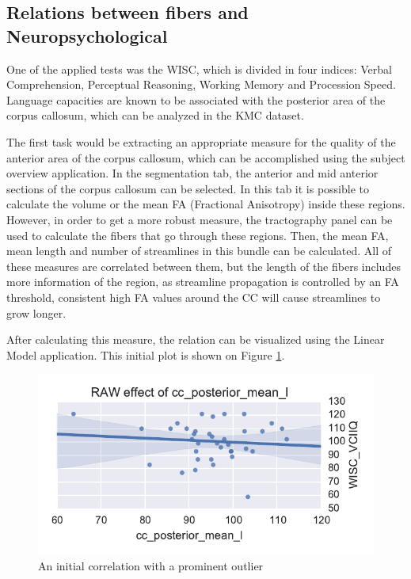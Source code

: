 \documentclass[twocolumn]{svjour3}
\begin{document}
\subsection{Relations between fibers and Neuropsychological}

One of the applied tests was the WISC, which is divided in four indices: Verbal Comprehension, Perceptual Reasoning, Working Memory and Procession Speed. 	Language capacities are known to be associated with the posterior area of the corpus callosum, which can be analyzed in the KMC dataset. 

The first task would be extracting an appropriate measure for the quality of the anterior area of the corpus callosum, which can be accomplished using the subject overview application. In the segmentation tab, the anterior and mid anterior sections of the corpus callosum can be selected. In this tab it is possible to calculate the volume or the mean FA (Fractional Anisotropy) inside these regions. However, in order to get a more robust measure, the tractography panel can be used to calculate the fibers that go through these regions. Then, the mean FA, mean length and number of streamlines in this bundle can be calculated. All of these measures are correlated between them, but the length of the fibers includes more information of the region, as streamline propagation is controlled by an FA threshold, consistent high FA values around the CC will cause streamlines to grow longer.

After calculating this measure, the relation can be visualized using the Linear Model application. This initial plot is shown on Figure \ref{fig_lm}.

\begin{figure}
\begin{center}
\includegraphics[width=\linewidth]{figures/cases/initial_corr}
\end{center}
 \caption{\label{fig_lm}An initial correlation with a prominent outlier}
\end{figure}
\end{document}
